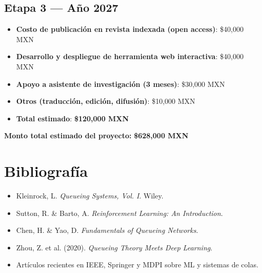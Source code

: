 \documentclass[12pt]{article}
\begin{document}
\subsection*{Etapa 3 — Año 2027}
\begin{itemize}
  \item \textbf{Costo de publicación en revista indexada (open access)}: \$40,000 MXN
  \item \textbf{Desarrollo y despliegue de herramienta web interactiva}: \$40,000 MXN
  \item \textbf{Apoyo a asistente de investigación (3 meses)}: \$30,000 MXN
  \item \textbf{Otros (traducción, edición, difusión)}: \$10,000 MXN
  \item \textbf{Total estimado}: \textbf{\$120,000 MXN}
\end{itemize}

\textbf{Monto total estimado del proyecto:} \textbf{\$628,000 MXN}



\section*{Bibliografía}
\begin{itemize}
  \item Kleinrock, L. \textit{Queueing Systems, Vol. I}. Wiley.
  \item Sutton, R. \& Barto, A. \textit{Reinforcement Learning: An Introduction}.
  \item Chen, H. \& Yao, D. \textit{Fundamentals of Queueing Networks}.
  \item Zhou, Z. et al. (2020). \textit{Queueing Theory Meets Deep Learning}.
  \item Artículos recientes en IEEE, Springer y MDPI sobre ML y sistemas de colas.
\end{itemize}
\end{document}
